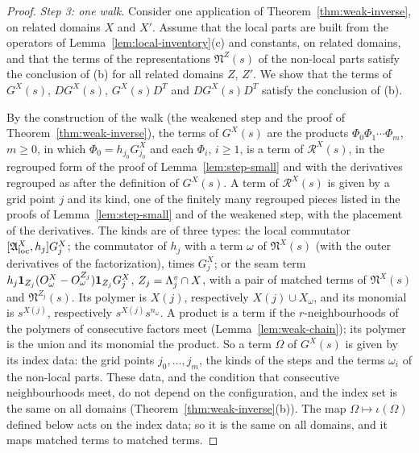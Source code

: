 \begin{proof}
\emph{Step 3: one walk.} Consider one application of Theorem~\ref{thm:weak-inverse}, on related domains $X$ and $X'$. Assume that the local parts are built from the operators of Lemma~\ref{lem:local-inventory}(c) and constants, on related domains, and that the terms of the representations $\mathfrak N^Z(s)$ of the non-local parts satisfy the conclusion of (b) for all related domains $Z$, $Z'$. We show that the terms of $G^X(s)$, $DG^X(s)$, $G^X(s)D^T$ and $DG^X(s)D^T$ satisfy the conclusion of (b).

By the construction of the walk (the weakened step and the proof of Theorem~\ref{thm:weak-inverse}), the terms of $G^X(s)$ are the products $\Phi_0\Phi_1\cdots\Phi_m$, $m\ge0$, in which $\Phi_0=h_{j_0}G^X_{j_0}$ and each $\Phi_i$, $i\ge1$, is a term of $\mathcal R^X(s)$, in the regrouped form of the proof of Lemma~\ref{lem:step-small} and with the derivatives regrouped as after the definition of $G^X(s)$. A term of $\mathcal R^X(s)$ is given by a grid point $j$ and its kind, one of the finitely many regrouped pieces listed in the proofs of Lemma~\ref{lem:step-small} and of the weakened step, with the placement of the derivatives. The kinds are of three types: the local commutator $[\mathfrak A^X_{\rm loc},h_j]G^X_j$; the commutator of $h_j$ with a term $\omega$ of $\mathfrak N^X(s)$ (with the outer derivatives of the factorization), times $G^X_j$; or the seam term $h_j\mathbf 1_{Z_j}(O^X_\omega-O^{Z_j}_\omega)\mathbf 1_{Z_j}G^X_j$, $Z_j=\Lambda^v_j\cap X$, with a pair of matched terms of $\mathfrak N^X(s)$ and $\mathfrak N^{Z_j}(s)$. Its polymer is $X(j)$, respectively $X(j)\cup X_\omega$, and its monomial is $s^{X(j)}$, respectively $s^{X(j)}s^{n_\omega}$. A product is a term if the $r$-neighbourhoods of the polymers of consecutive factors meet (Lemma~\ref{lem:weak-chain}); its polymer is the union and its monomial the product. So a term $\Omega$ of $G^X(s)$ is given by its index data: the grid points $j_0,\dots,j_m$, the kinds of the steps and the terms $\omega_i$ of the non-local parts. These data, and the condition that consecutive neighbourhoods meet, do not depend on the configuration, and the index set is the same on all domains (Theorem~\ref{thm:weak-inverse}(b)). The map $\Omega\mapsto\iota(\Omega)$ defined below acts on the index data; so it is the same on all domains, and it maps matched terms to matched terms.


\end{proof}
